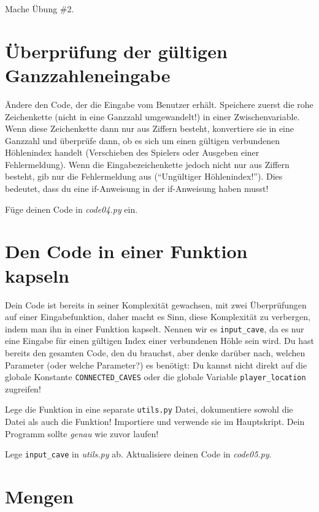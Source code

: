 \documentclass[
]{book}
\begin{document}
Mache Übung \#2.

\hypertarget{uxfcberpruxfcfung-der-guxfcltigen-ganzzahleneingabe}{%
\section{Überprüfung der gültigen Ganzzahleneingabe}\label{uxfcberpruxfcfung-der-guxfcltigen-ganzzahleneingabe}}

Ändere den Code, der die Eingabe vom Benutzer erhält. Speichere zuerst die rohe Zeichenkette (nicht in eine Ganzzahl umgewandelt!) in einer Zwischenvariable. Wenn diese Zeichenkette dann nur aus Ziffern besteht, konvertiere sie in eine Ganzzahl und überprüfe dann, ob es sich um einen gültigen verbundenen Höhlenindex handelt (Verschieben des Spielers oder Ausgeben einer Fehlermeldung). Wenn die Eingabezeichenkette jedoch nicht nur aus Ziffern besteht, gib nur die Fehlermeldung aus (``Ungültiger Höhlenindex!''). Dies bedeutet, dass du eine if-Anweisung in der if-Anweisung haben musst!

Füge deinen Code in \emph{code04.py} ein.

\hypertarget{den-code-in-einer-funktion-kapseln}{%
\section{Den Code in einer Funktion kapseln}\label{den-code-in-einer-funktion-kapseln}}

Dein Code ist bereits in seiner Komplexität gewachsen, mit zwei Überprüfungen auf einer Eingabefunktion, daher macht es Sinn, diese Komplexität zu verbergen, indem man ihn in einer Funktion kapselt. Nennen wir es \texttt{input\_cave}, da es nur eine Eingabe für einen gültigen Index einer verbundenen Höhle sein wird. Du hast bereits den gesamten Code, den du brauchst, aber denke darüber nach, welchen Parameter (oder welche Parameter?) es benötigt: Du kannst nicht direkt auf die globale Konstante \texttt{CONNECTED\_CAVES} oder die globale Variable \texttt{player\_location} zugreifen!

Lege die Funktion in eine separate \texttt{utils.py} Datei, dokumentiere sowohl die Datei als auch die Funktion! Importiere und verwende sie im Hauptskript. Dein Programm sollte \emph{genau} wie zuvor laufen!

Lege \texttt{input\_cave} in \emph{utils.py} ab.
Aktualisiere deinen Code in \emph{code05.py}.

\hypertarget{sets}{%
\section{Mengen}\label{sets}}
\end{document}
